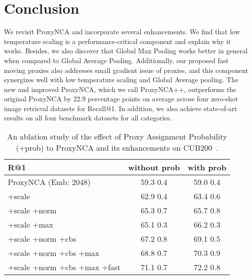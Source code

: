 \documentclass[runningheads]{llncs}
\begin{document}
\section{Conclusion}\label{sec:conclude}
We revisit ProxyNCA and incorporate several enhancements. We find that low temperature scaling is a performance-critical component and explain why it works. Besides, we also discover that Global Max Pooling works better in general when compared to Global Average Pooling. Additionally, our proposed fast moving proxies also addresses small gradient issue of proxies, and this component synergizes well with low temperature scaling and Global Average pooling. 
The new and improved ProxyNCA, which we call ProxyNCA++, outperforms the original ProxyNCA by 22.9 percentage points on average across four zero-shot image retrieval datasets for Recall@1. In addition, we also achieve state-of-art results on all four benchmark datasets for all categories.

\begin{table}[ht]
\centering
\caption{An ablation study of the effect of Proxy Assignment Probability (+prob) to ProxyNCA and its enhancements on CUB200~\cite{wah2011caltech}.}
\setlength{\tabcolsep}{3pt}
\begin{tabular}{|l|c|c|}
\hline
R@1 & without prob & with prob  \\ \hline
\small{ProxyNCA (Emb: 2048)}& 59.3  0.4 & 59.0  0.4\\
\hspace{0.3cm}\small{+scale}& 62.9  0.4 & 63.4  0.6 \\
\hspace{0.3cm}\small{+scale +norm} & 65.3  0.7 & 65.7  0.8\\
\hspace{0.3cm}\small{+scale +max} & 65.1  0.3 & 66.2   0.3\\
\hspace{0.3cm}\small{+scale +norm +cbs} & 67.2  0.8 & 69.1  0.5 \\
\hspace{0.3cm}\small{+scale +norm +cbs +max}& 68.8  0.7& 70.3  0.9 \\
\hspace{0.3cm}\small{+scale +norm +cbs +max +fast} & 71.1  0.7 & 72.2   0.8 \\
\hline
\end{tabular}
\label{table:prob_det}
\end{table}
\end{document}
